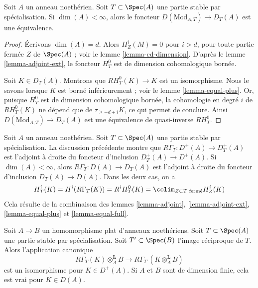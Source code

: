 \begin{lemma}
\label{lemma-equal-full}
Soit $A$ un anneau noethérien. Soit $T \subset \Spec(A)$ une partie stable par spécialisation. Si $\dim(A) < \infty$, alors le foncteur $D(\text{Mod}_{A, T}) \to D_T(A)$ est une équivalence.
\end{lemma}

\begin{proof}
Écrivons $\dim(A) = d$. Alors $H^i_Z(M) = 0$ pour $i > d$, pour toute partie fermée $Z$ de $\Spec(A)$ ; voir le lemme \ref{lemma-cd-dimension}. D'après le lemme \ref{lemma-adjoint-ext}, le foncteur $H^0_T$ est de dimension cohomologique bornée.

\medskip\noindent
Soit $K \in D_T(A)$. Montrons que $RH^0_T(K) \to K$ est un isomorphisme. Nous le savons lorsque $K$ est borné inférieurement ; voir le lemme \ref{lemma-equal-plus}. Or, puisque $H^0_T$ est de dimension cohomologique bornée, la cohomologie en degré $i$ de $RH_T^0(K)$ ne dépend que de $\tau_{\geq -d + i}K$, ce qui permet de conclure. Ainsi $D(\text{Mod}_{A, T}) \to D_T(A)$ est une équivalence de quasi-inverse $RH^0_T$.
\end{proof}

\begin{remark}
\label{remark-upshot}
Soit $A$ un anneau noethérien. Soit $T \subset \Spec(A)$ une partie stable par spécialisation. La discussion précédente montre que $R\Gamma_T : D^+(A) \to D_T^+(A)$ est l'adjoint à droite du foncteur d'inclusion $D_T^+(A) \to D^+(A)$. Si $\dim(A) < \infty$, alors $R\Gamma_T : D(A) \to D_T(A)$ est l'adjoint à droite du foncteur d'inclusion $D_T(A) \to D(A)$. Dans les deux cas, on a
$$
H^i_T(K) = H^i(R\Gamma_T(K)) = R^iH^0_T(K) =
\colim_{Z \subset T\text{ fermé}} H^i_Z(K)
$$
Cela résulte de la combinaison des lemmes \ref{lemma-adjoint}, \ref{lemma-adjoint-ext}, \ref{lemma-equal-plus} et \ref{lemma-equal-full}.
\end{remark}

\begin{lemma}
\label{lemma-torsion-change-rings}
Soit $A \to B$ un homomorphisme plat d'anneaux noethériens. Soit $T \subset \Spec(A)$ une partie stable par spécialisation. Soit $T' \subset \Spec(B)$ l'image réciproque de $T$. Alors l'application canonique
$$
R\Gamma_T(K) \otimes_A^\mathbf{L} B
\longrightarrow
R\Gamma_{T'}(K \otimes_A^\mathbf{L} B)
$$
est un isomorphisme pour $K \in D^+(A)$. Si $A$ et $B$ sont de dimension finie, cela est vrai pour $K \in D(A)$.
\end{lemma}

